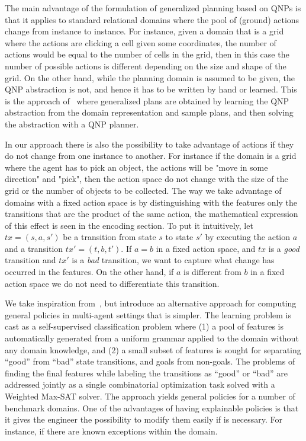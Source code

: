 \documentclass[a4paper]{article}
\begin{document}
The main advantage of the formulation of generalized planning based on QNPs is that it applies to standard relational domains where the pool of (ground) actions change from instance to instance. For instance, given a domain that is a grid where the actions are clicking a cell given some coordinates, the number of actions would be equal to the number of cells in the grid, then in this case the number of possible actions is different depending on the size and shape of the grid. On the other hand, while the planning domain is assumed to be given, the QNP abstraction is not, and hence it has to be written by hand or learned. This is the approach of~\cite{DBLP:conf/aaai/BonetFG19} where generalized plans are obtained by learning the QNP abstraction from the domain representation and sample plans, and then solving the abstraction with a QNP planner.


In our approach there is also the possibility to take advantage of actions if they do not change from one instance to another. For instance if the domain is a grid where the agent has to pick an object, the actions will be "move in some direction" and "pick", then the action space do not change with the size of the grid or the number of objects to be collected. The way we take advantage of domains with a fixed action space is by distinguishing with the features only the transitions that are the product of the same action, the mathematical expression of this effect is seen in the encoding section. To put it intuitively, let $tx=(s, a, s')$ be a transition from state $s$ to state $s'$ by executing the action $a$ and a transition $tx'=(t, b, t')$. If $a=b$ in a fixed action space, and $tx$ is a \emph{good} transition and $tx'$ is a \emph{bad} transition, we want to capture what change has occurred in the features. On the other hand, if $a$ is different from $b$ in a fixed action space we do not need to differentiate this transition.


We take inspiration from~\cite{frances2021learning}, but introduce an alternative approach for computing general policies in multi-agent settings that is simpler. The learning problem is cast as a self-supervised classification problem where (1) a pool of features is automatically generated from a uniform grammar applied to the domain without any domain knowledge, and (2) a small subset of features is sought for separating “good” from “bad” state transitions, and goals from non-goals. The problems of finding the final features while labeling the transitions as “good” or “bad” are addressed jointly as a single combinatorial optimization task solved with a Weighted Max-SAT solver. The approach yields general policies for a number of benchmark domains. One of the advantages of having explainable policies is that it gives the engineer the possibility to modify them easily if is necessary. For instance, if there are known exceptions within the domain.
\end{document}

